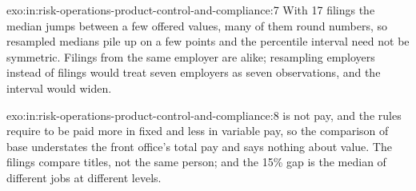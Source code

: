 \begin{solution}{exo:in:risk-operations-product-control-and-compliance:7}
With 17 filings the median jumps between a few offered values, many of them round numbers, so resampled medians pile up
on a few points and the percentile interval need not be symmetric. Filings from the same employer are alike; resampling
employers instead of filings would treat seven employers as seven observations, and the interval would widen.
\end{solution}

\begin{solution}{exo:in:risk-operations-product-control-and-compliance:8}
 is not pay, and the rules require  to be paid more in fixed and less in variable pay, so the
comparison of base understates the front office's total pay and says nothing about value. The filings compare titles,
not the same person; and the 15\% gap is the median of different jobs at different levels.
\end{solution}

